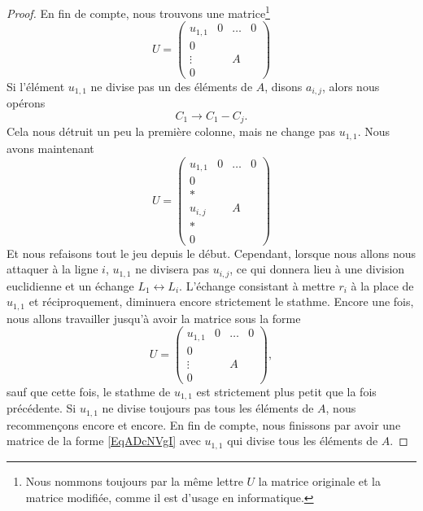 \begin{proof}
	En fin de compte, nous trouvons une matrice\footnote{Nous nommons toujours par la même lettre \( U\) la matrice originale et la matrice modifiée, comme il est d'usage en informatique.}
	\begin{equation}
		U=\begin{pmatrix}
			u_{1,1} & 0 & \ldots & 0 \\
			0       &   &        &   \\
			\vdots  &   & A      &   \\
			0       &   &        &
		\end{pmatrix}
	\end{equation}
	Si l'élément \( u_{1,1}\) ne divise pas un des éléments de \( A\), disons \( a_{i,j}\), alors nous opérons
	\begin{equation}
		C_1\to C_1-C_j.
	\end{equation}
	Cela nous détruit un peu la première colonne, mais ne change pas \( u_{1,1}\). Nous avons maintenant
	\begin{equation}
		U=\begin{pmatrix}
			u_{1,1} & 0 & \ldots & 0 \\
			0       &   &        &   \\
			*       &   &        &   \\
			u_{i,j} &   & A      &   \\
			*       &   &        &   \\
			0       &   &        &
		\end{pmatrix}
	\end{equation}
	Et nous refaisons tout le jeu depuis le début. Cependant, lorsque nous allons nous attaquer à la ligne \( i\), \( u_{1,1}\) ne divisera pas \( u_{i,j}\), ce qui donnera lieu à une division euclidienne et un échange \( L_1\leftrightarrow L_i\). L'échange consistant à mettre \( r_i\) à la place de \( u_{1,1}\) et réciproquement, diminuera encore strictement le stathme. Encore une fois, nous allons travailler jusqu'à avoir la matrice sous la forme
	\begin{equation}    \label{EqADcNVgI}
		U=\begin{pmatrix}
			u_{1,1} & 0 & \ldots & 0 \\
			0       &   &        &   \\
			\vdots  &   & A      &   \\
			0       &   &        &
		\end{pmatrix},
	\end{equation}
	sauf que cette fois, le stathme de \( u_{1,1}\) est strictement plus petit que la fois précédente. Si \( u_{1,1}\) ne divise toujours pas tous les éléments de \( A\), nous recommençons encore et encore. En fin de compte, nous finissons par avoir une matrice de la forme \eqref{EqADcNVgI} avec \( u_{1,1}\) qui divise tous les éléments de \( A\).


\end{proof}
